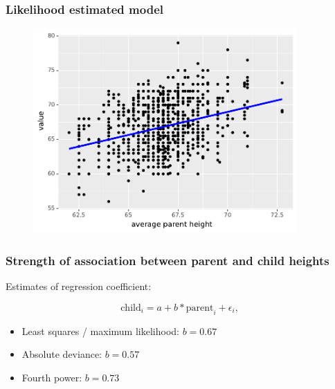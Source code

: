 \documentclass[handout]{beamer}
\begin{document}
\begin{frame}
	\frametitle{Likelihood estimated model}
	
	\begin{figure}[ht]
		\centerline{\includegraphics[width=0.9\textwidth]{../figures/galton_fit_sse.pdf}}
	\end{figure}
	
\end{frame}

\begin{frame}
	\frametitle{Strength of association between parent and child heights}
	
	Estimates of regression coefficient:
	
	\begin{equation}
	\text{child}_i = a + b * \text{parent}_i + \epsilon_i,
	\end{equation}
	
	\begin{itemize}
		\item Least squares / maximum likelihood: $b=0.67$
		\item Absolute deviance: $b=0.57$
		\item Fourth power: $b=0.73$
	\end{itemize}
	
\end{frame}
\end{document}
